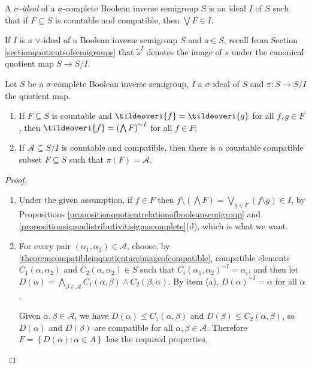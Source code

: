 \begin{definition}
A \emph{$\sigma$-ideal} of a $\sigma$-complete Boolean inverse semigroup $S$ is an ideal $I$ of $S$ such that if $F\subseteq S$ is countable and compatible, then $\bigvee F\in I$.
\end{definition}

If $I$ is a $\lor$-ideal of a Boolean inverse semigroup $S$ and $s\in S$, recall from Section \ref{sectionquotientsofsemigroups} that $\widetilde{s}^I$ denotes the image of $s$ under the canonical quotient map $S\to S/I$.

\begin{lemma}\label{lemmasigmacompatibility}
Let $S$ be a $\sigma$-complete Boolean inverse semigroup, $I$ a $\sigma$-ideal of $S$ and $\pi:S\to S/I$ the quotient map.
\begin{enumerate}
\item[(a)] If $F\subseteq S$ is countable and $\tildeoveri{f}=\tildeoveri{g}$ for all $f,g\in F$, then $\tildeoveri{f}=\left(\bigwedge F\right)^{\sim I}$ for all $f\in F$;
\item[(b)] If $\mathscr{A}\subseteq S/I$ is countable and compatible, then there is a countable compatible subset $F\subseteq S$ such that $\pi(F)=\mathscr{A}$.
\end{enumerate}
\end{lemma}
\begin{proof}
\begin{enumerate}
\item[(a)] Under the given assumption, if $f\in F$ then $f\setminus\left(\bigwedge F\right)=\bigvee_{g\in F}(f\setminus g)\in I$, by Propositions \ref{propositionquotientrelationofbooleansemigroup} and \ref{propositionsigmadistributivitisigmacomplete}(d), which is what we want.
\item[(b)] For every pair $(\alpha_1,\alpha_2)\in\mathscr{A}$, choose, by \ref{theoremcompatibleinquotientareimageofcompatible}, compatible elements $C_1(\alpha,\alpha_2)$ and $C_2(\alpha,\alpha_2)\in S$ such that $C_i(\alpha_1,\alpha_2)^{\sim I}=\alpha_i$, and then let $D(\alpha)=\bigwedge_{\beta\in\mathscr{A}}C_1(\alpha,\beta)\land C_2(\beta,\alpha)$. By item (a), $D(\alpha)^{\sim I}=\alpha$ for all $\alpha$.

Given $\alpha,\beta\in\mathscr{A}$, we have $D(\alpha)\leq C_1(\alpha,\beta)$ and $D(\beta)\leq C_2(\alpha,\beta)$, so $D(\alpha)$ and $D(\beta)$ are compatible for all $\alpha,\beta\in\mathscr{A}$. Therefore $F=\left\{D(\alpha):\alpha\in A\right\}$ has the required properties.\qedhere
\end{enumerate}
\end{proof}

